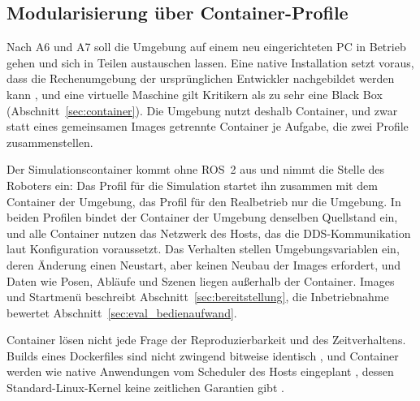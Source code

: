 \subsection{Modularisierung über Container-Profile}
\label{sec:container_profile}
Nach A6 und A7 soll die Umgebung auf einem neu eingerichteten PC in Betrieb gehen und sich in Teilen austauschen
lassen.
Eine native Installation setzt voraus, dass die Rechenumgebung der ursprünglichen Entwickler nachgebildet werden kann
\cite{Boettiger2015}, und eine virtuelle Maschine gilt Kritikern als zu sehr eine Black Box
\cite{Boettiger2015} (Abschnitt~\ref{sec:container}).
Die Umgebung nutzt deshalb Container, und zwar statt eines gemeinsamen Images getrennte Container je Aufgabe, die
zwei Profile zusammenstellen.

Der Simulationscontainer kommt ohne ROS~2 aus und nimmt die Stelle des Roboters ein: Das Profil für die Simulation
startet ihn zusammen mit dem Container der Umgebung, das Profil für den Realbetrieb nur die Umgebung.
In beiden Profilen bindet der Container der Umgebung denselben Quellstand ein, und alle Container nutzen das Netzwerk
des Hosts, das die DDS-Kommunikation laut Konfiguration voraussetzt.
Das Verhalten stellen Umgebungsvariablen ein, deren Änderung einen Neustart, aber keinen Neubau der Images erfordert,
und Daten wie Posen, Abläufe und Szenen liegen außerhalb der Container.
Images und Startmenü beschreibt Abschnitt~\ref{sec:bereitstellung}, die Inbetriebnahme bewertet
Abschnitt~\ref{sec:eval_bedienaufwand}.

Container lösen nicht jede Frage der Reproduzierbarkeit und des Zeitverhaltens.
Builds eines Dockerfiles sind nicht zwingend bitweise identisch \cite{Boettiger2015}, und
Container werden wie native Anwendungen vom Scheduler des Hosts eingeplant \cite{Struhar2020},
dessen Standard-Linux-Kernel keine zeitlichen Garantien gibt \cite{Struhar2020}.
